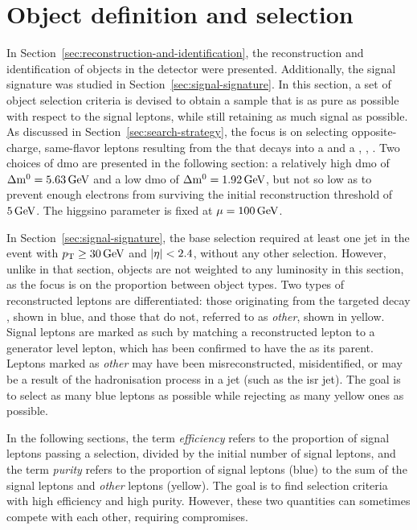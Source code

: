 \clearpage
\section{Object definition and selection}
\label{sec:object-selection}

In Section~\ref{sec:reconstruction-and-identification}, the reconstruction and identification of objects in the detector were presented. Additionally, the signal signature was studied in Section~\ref{sec:signal-signature}. In this section, a set of object selection criteria is devised to obtain a sample that is as pure as possible with respect to the signal leptons, while still retaining as much signal as possible. As discussed in Section~\ref{sec:search-strategy}, the focus is on selecting opposite-charge, same-flavor leptons \ellell resulting from the \neutt that decays into a \neuto and a \PZstar, \ie, \neuttdecay. Two choices of \gls{dmo} are presented in the following section: a relatively high \gls{dmo} of $\Delta\mathrm{m}^0=5.63\,\text{Ge\hspace{-.08em}V}$ and a low \gls{dmo} of $\Delta\mathrm{m}^0=1.92\,\text{Ge\hspace{-.08em}V}$, but not so low as to prevent enough electrons from surviving the initial reconstruction \pt threshold of $5\,\text{Ge\hspace{-.08em}V}$. The higgsino parameter is fixed at $\mu=100\,\text{Ge\hspace{-.08em}V}$.

In Section~\ref{sec:signal-signature}, the base selection required at least one jet in the event with $p_{\mathrm{T}} \geq 30\,\text{Ge\hspace{-.08em}V}$ and $\lvert \eta \rvert<2.4$, without any other selection. However, unlike in that section, objects are not weighted to any luminosity in this section, as the focus is on the proportion between object types. Two types of reconstructed leptons are differentiated: those originating from the targeted decay \neuttdecay, shown in blue, and those that do not, referred to as \emph{other}, shown in yellow. Signal leptons are marked as such by matching a reconstructed lepton to a generator level lepton, which has been confirmed to have the \neutt as its parent. Leptons marked as \emph{other} may have been misreconstructed, misidentified, or may be a result of the hadronisation process in a jet (such as the \gls{isr} jet). The goal is to select as many blue leptons as possible while rejecting as many yellow ones as possible.

In the following sections, the term \emph{efficiency} refers to the proportion of signal leptons passing a selection, divided by the initial number of signal leptons, and the term \emph{purity} refers to the proportion of signal leptons (blue) to the sum of the signal leptons and \emph{other} leptons (yellow). The goal is to find selection criteria with high efficiency and high purity. However, these two quantities can sometimes compete with each other, requiring compromises.

